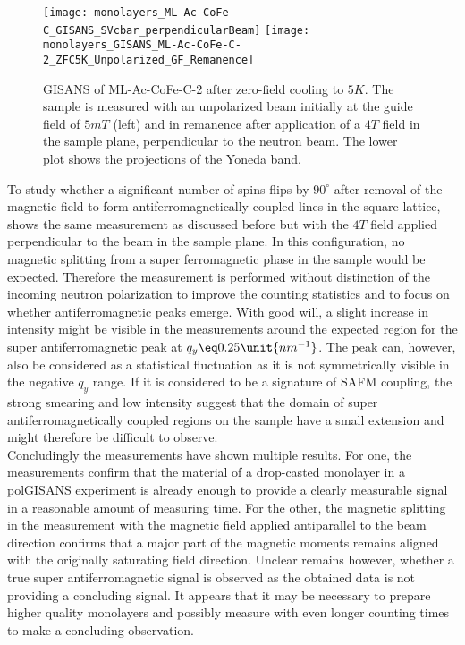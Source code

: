 \documentclass[\main/dresen_thesis.tex]{subfiles}
\begin{document}
  \begin{figure}[tb]
    \centering
    \texttt{[image: monolayers\_ML-Ac-CoFe-C\_GISANS\_SVcbar\_perpendicularBeam]}
    \texttt{[image: monolayers\_GISANS\_ML-Ac-CoFe-C-2\_ZFC5K\_Unpolarized\_GF\_Remanence]}
    \caption{\label{fig:monolayer:magneticStructure:Gisans5KZFCperpendicular}GISANS of ML-Ac-CoFe-C-2 after zero-field cooling to $5 \unit{K}$. The sample is measured with an unpolarized beam initially at the guide field of $5 \unit{mT}$ (left) and in remanence after application of a $4 \unit{T}$ field in the sample plane, perpendicular to the neutron beam. The lower plot shows the projections of the Yoneda band.}
  \end{figure}

  To study whether a significant number of spins flips by $90 ^\circ$ after removal of the magnetic field to form antiferromagnetically coupled lines in the square lattice,  shows the same measurement as discussed before but with the $4 \unit{T}$ field applied perpendicular to the beam in the sample plane.
  In this configuration, no magnetic splitting from a super ferromagnetic phase in the sample would be expected.
  Therefore the measurement is performed without distinction of the incoming neutron polarization to improve the counting statistics and to focus on whether antiferromagnetic peaks emerge.
  With good will, a slight increase in intensity might be visible in the measurements around the expected region for the super antiferromagnetic peak at $q_y \eq 0.25 \unit{nm^{-1}}$.
  The peak can, however, also be considered as a statistical fluctuation as it is not symmetrically visible in the negative $q_y$ range.
  If it is considered to be a signature of SAFM coupling, the strong smearing and low intensity suggest that the domain of super antiferromagnetically coupled regions on the sample have a small extension and might therefore be difficult to observe.
  \\

  Concludingly the measurements have shown multiple results.
  For one, the measurements confirm that the material of a drop-casted monolayer in a polGISANS experiment is already enough to provide a clearly measurable signal in a reasonable amount of measuring time.
  For the other, the magnetic splitting in the measurement with the magnetic field applied antiparallel to the beam direction confirms that a major part of the magnetic moments remains aligned with the originally saturating field direction.
  Unclear remains however, whether a true super antiferromagnetic signal is observed as the obtained data is not providing a concluding signal.
  It appears that it may be necessary to prepare higher quality monolayers and possibly measure with even longer counting times to make a concluding observation.

\end{document}

